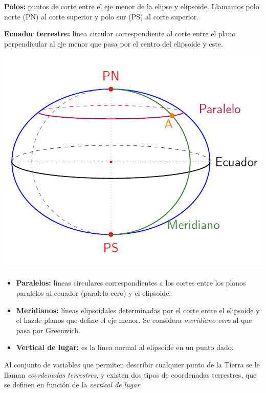 \begin{itemize}
	\begin{minipage}{.45\textwidth}
	\item   \textbf{Polos:} puntos de corte entre el eje menor de la elipse y elipsoide. Llamamos polo norte (PN) al corte superior y polo sur (PS) al corte superior.   
	\item \textbf{Ecuador terrestre:} línea circular correspondiente al corte entre el plano perpendicular al eje menor que pasa por el centro del elipsoide y este.
	\end{minipage}	\hfill
	\begin{minipage}{0.45\textwidth} \centering
	\includegraphics[scale=0.37]{Cuerpo/Imagenes/01_Elipsoide.png} 
	\end{minipage}
\end{itemize}
\begin{itemize}
	\item \textbf{Paralelos:} líneas circulares correspondientes a los cortes entre los planos paralelos al ecuador (paralelo cero) y el elipsoide.
	\item \textbf{Meridianos:} líneas elipsoidales determinadas por el corte entre el elipsoide y el hazde planos que define el eje menor. Se considera \textit{meridiano cero} al que pasa por Greenwich.
	\item \textbf{Vertical de lugar:} es la línea normal al elipsoide en un punto dado.
\end{itemize}


Al conjunto de variables que permiten describir cualquier punto de la Tierra se le llaman \textit{coordenadas terrestres}, y existen dos tipos de coordenadas terrestres, que se definen en función de la \textit{vertical de lugar}

